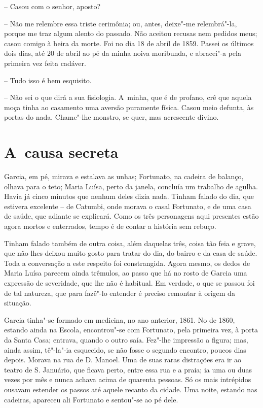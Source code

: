 -- Casou com o senhor, aposto?

-- Não me relembre essa triste cerimônia; ou, antes, deixe"-me
relembrá"-la, porque me traz algum alento do passado. Não aceitou recusas
nem pedidos meus; casou comigo à beira da morte. Foi no dia 18 de abril
de 1859. Passei os últimos dois dias, até 20 de abril ao pé da minha
noiva moribunda, e abracei"-a pela primeira vez feita cadáver.

-- Tudo isso é bem esquisito.

-- Não sei o que dirá a sua fisiologia. A~minha, que é de profano, crê
que aquela moça tinha ao casamento uma aversão puramente física. Casou
meio defunta, às portas do nada. Chame"-lhe monstro, se quer, mas
acrescente divino.

\chapter{A~causa secreta}

Garcia, em pé, mirava e estalava as unhas; Fortunato, na cadeira de
balanço, olhava para o teto; Maria Luísa, perto da janela, concluía um
trabalho de agulha. Havia já cinco minutos que nenhum deles dizia nada.
Tinham falado do dia, que estivera excelente -- de Catumbi, onde morava
o casal Fortunato, e de uma casa de saúde, que adiante se explicará.
Como os três personagens aqui presentes estão agora mortos e enterrados,
tempo é de contar a história sem rebuço.

Tinham falado também de outra coisa, além daquelas três, coisa tão feia
e grave, que não lhes deixou muito gosto para tratar do dia, do bairro e
da casa de saúde. Toda a conversação a este respeito foi constrangida.
Agora mesmo, os dedos de Maria Luísa parecem ainda trêmulos, ao passo
que há no rosto de Garcia uma expressão de severidade, que lhe não é
habitual. Em verdade, o que se passou foi de tal natureza, que para
fazê"-lo entender é preciso remontar à origem da situação.

Garcia tinha"-se formado em medicina, no ano anterior, 1861. No de 1860,
estando ainda na Escola, encontrou"-se com Fortunato, pela primeira vez,
à porta da Santa Casa; entrava, quando o outro saía. Fez"-lhe impressão a
figura; mas, ainda assim, tê"-la"-ia esquecido, se não fosse o segundo
encontro, poucos dias depois. Morava na rua de D. Manoel. Uma de suas
raras distrações era ir ao teatro de S. Januário, que ficava perto,
entre essa rua e a praia; ia uma ou duas vezes por mês e nunca achava
acima de quarenta pessoas. Só os mais intrépidos ousavam estender os
passos até aquele recanto da cidade. Uma noite, estando nas cadeiras,
apareceu ali Fortunato e sentou"-se ao pé dele.

